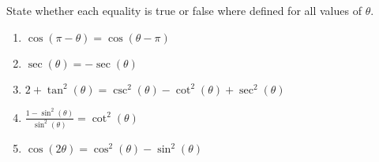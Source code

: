 \documentclass{ximera}
\author{Kenneth Berglund}
\begin{document}
\begin{exercise}
State whether each equality is true or false where defined for all values of $\theta$.

\begin{enumerate} 
\item $\cos(\pi - \theta) = \cos(\theta - \pi)$
\begin{multipleChoice}  
\end{multipleChoice}  

\item $\sec(\theta) = -\sec(\theta)$
\begin{multipleChoice}  
\end{multipleChoice}  

\item $2 + \tan^2(\theta) = \csc^2(\theta) - \cot^2(\theta) + \sec^2(\theta)$
\begin{multipleChoice}  
\end{multipleChoice}  

\item $\frac{1 - \sin^2(\theta)}{\sin^2(\theta)} = \cot^2(\theta)$
\begin{multipleChoice}  
\end{multipleChoice}  

\item $\cos(2\theta) = \cos^2(\theta) - \sin^2(\theta)$
\begin{multipleChoice}  
\end{multipleChoice}  

\end{enumerate}



\end{exercise}
\end{document}
